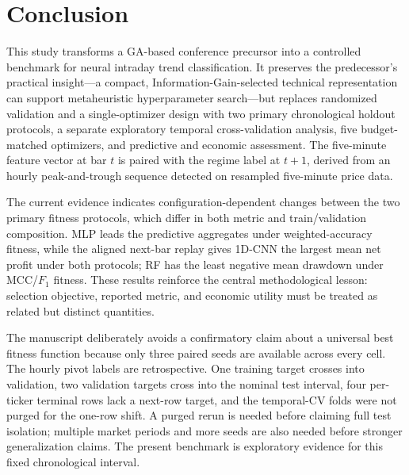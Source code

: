 \section{Conclusion}\label{sec:conclusion}

This study transforms a GA-based conference precursor into a controlled benchmark for neural intraday trend classification. It preserves the predecessor's practical insight---a compact, Information-Gain-selected technical representation can support metaheuristic hyperparameter search---but replaces randomized validation and a single-optimizer design with two primary chronological holdout protocols, a separate exploratory temporal cross-validation analysis, five budget-matched optimizers, and predictive and economic assessment. The five-minute feature vector at bar $t$ is paired with the regime label at $t+1$, derived from an hourly peak-and-trough sequence detected on resampled five-minute price data.

The current evidence indicates configuration-dependent changes between the two primary fitness protocols, which differ in both metric and train/validation composition. MLP leads the predictive aggregates under weighted-accuracy fitness, while the aligned next-bar replay gives 1D-CNN the largest mean net profit under both protocols; RF has the least negative mean drawdown under MCC/$F_1$ fitness. These results reinforce the central methodological lesson: selection objective, reported metric, and economic utility must be treated as related but distinct quantities.

The manuscript deliberately avoids a confirmatory claim about a universal best fitness function because only three paired seeds are available across every cell. The hourly pivot labels are retrospective. One training target crosses into validation, two validation targets cross into the nominal test interval, four per-ticker terminal rows lack a next-row target, and the temporal-CV folds were not purged for the one-row shift. A purged rerun is needed before claiming full test isolation; multiple market periods and more seeds are also needed before stronger generalization claims. The present benchmark is exploratory evidence for this fixed chronological interval.
